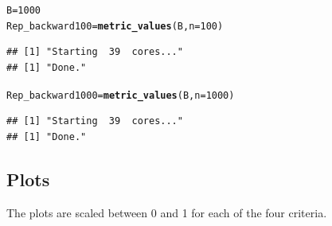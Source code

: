\documentclass[11pt]{article}\usepackage[]{graphicx}\usepackage[]{color}
\makeatletter
\newcommand{\hlnum}[1]{\textcolor[rgb]{0.686,0.059,0.569}{#1}}%
\newcommand{\hlstd}[1]{\textcolor[rgb]{0.345,0.345,0.345}{#1}}%
\newcommand{\hlkwb}[1]{\textcolor[rgb]{0.69,0.353,0.396}{#1}}%
\newcommand{\hlkwc}[1]{\textcolor[rgb]{0.333,0.667,0.333}{#1}}%
\newcommand{\hlkwd}[1]{\textcolor[rgb]{0.737,0.353,0.396}{\textbf{#1}}}%
\newenvironment{kframe}{%
 \def\at@end@of@kframe{}%
 \ifinner\ifhmode%
  \def\at@end@of@kframe{\end{minipage}}%
  \begin{minipage}{\columnwidth}%
 \fi\fi%
 \def\FrameCommand##1{\hskip\@totalleftmargin \hskip-\fboxsep
 \colorbox{shadecolor}{##1}\hskip-\fboxsep
     \hskip-\linewidth \hskip-\@totalleftmargin \hskip\columnwidth}%
 \MakeFramed {\advance\hsize-\width
   \@totalleftmargin\z@ \linewidth\hsize
   \@setminipage}}%
 {\par\unskip\endMakeFramed%
 \at@end@of@kframe}
\newenvironment{knitrout}{}{} %
\makeatother
\begin{document}
\begin{knitrout}
\begin{kframe}
\begin{alltt}
\hlstd{B} \hlkwb{=} \hlnum{1000}
\hlstd{Rep_backward100} \hlkwb{=} \hlkwd{metric_values}\hlstd{(B,}\hlkwc{n}\hlstd{=}\hlnum{100}\hlstd{)}
\end{alltt}
\begin{verbatim}
## [1] "Starting  39  cores..."
## [1] "Done."
\end{verbatim}
\begin{alltt}
\hlstd{Rep_backward1000} \hlkwb{=} \hlkwd{metric_values}\hlstd{(B,}\hlkwc{n}\hlstd{=}\hlnum{1000}\hlstd{)}
\end{alltt}
\begin{verbatim}
## [1] "Starting  39  cores..."
## [1] "Done."
\end{verbatim}
\end{kframe}
\end{knitrout}
\subsection{Plots}
The plots are scaled between 0 and 1 for each of the four criteria.
\end{document}

